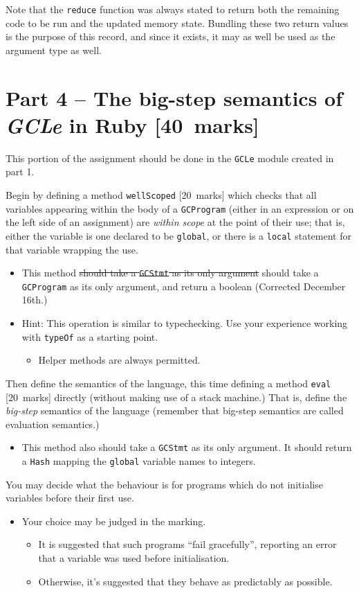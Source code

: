 \documentclass[11pt]{article}
\theoremstyle{definition}
\begin{document}
Note that the \texttt{reduce} function was always stated to return both
the remaining code to be run and the updated memory state.
Bundling these two return values is the purpose of this record,
and since it exists, it may as well be used as the argument type as well.

\section*{Part 4 – The big-step semantics of \emph{GCLe} in Ruby       [40 marks]}
\label{sec:org55896b4}
This portion of the assignment should be done in
the \texttt{GCLe} module created in part 1.

Begin by defining a method \texttt{wellScoped} [20 marks] which checks that
all variables appearing within the body of a \texttt{GCProgram}
(either in an expression or on the left side of an assignment)
are \emph{within scope} at the point of their use;
that is, either the variable is one declared to be \texttt{global},
or there is a \texttt{local} statement for that variable wrapping the use.
\begin{itemize}
\item This method
\sout{should take a \texttt{GCStmt} as its only argument}
should take a \texttt{GCProgram} as its only argument,
and return a boolean (Corrected December 16th.)
\item Hint: This operation is similar to typechecking.
Use your experience working with \texttt{typeOf} as a starting point.
\begin{itemize}
\item Helper methods are always permitted.
\end{itemize}
\end{itemize}

Then define the semantics of the language,
this time defining a method \texttt{eval} [20 marks] directly
(without making use of a stack machine.)
That is, define the \emph{big-step} semantics of the language
(remember that big-step semantics are called evaluation semantics.)
\begin{itemize}
\item This method also should take a \texttt{GCStmt} as its only argument.
It should return a \texttt{Hash} mapping the \texttt{global} variable names
to integers.
\end{itemize}

You may decide what the behaviour is for programs which
do not initialise variables before their first use.
\begin{itemize}
\item Your choice may be judged in the marking.
\begin{itemize}
\item It is suggested that such programs “fail gracefully”,
reporting an error that a variable was used before initialisation.
\item Otherwise, it's suggested that they behave as predictably as possible.
\end{itemize}
\end{itemize}
\end{document}
